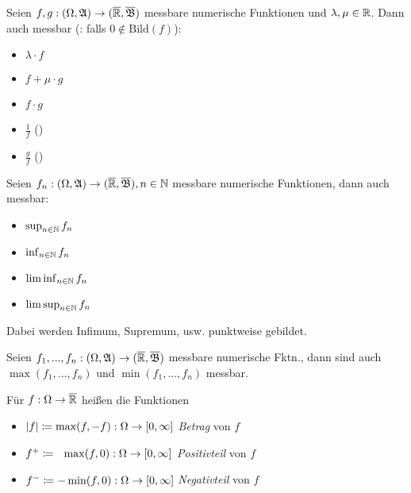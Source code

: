 \documentclass{cheat-sheet}
\newcommand{\Alg}{\mathfrak{A}} %
\newcommand{\Bor}{\mathfrak{B}} %
\theoremstyle{definition}
\begin{document}
\begin{satz}
  Seien $f, g : (\Omega, \Alg) \to (\ER, \overline{\Bor})$ messbare numerische Funktionen und $\lambda, \mu \in \mathbb{R}$. Dann auch messbar (\ddag: falls $0 \not\in \mathrm{Bild}(f)$):
  \begin{multicols}{5}
    \begin{itemize}
      \item $\lambda \cdot f$
      \item $f + \mu \cdot g$
      \item $f \cdot g$
      \item $\tfrac{1}{f}$ (\ddag)
      \item $\tfrac{g}{f}$ (\ddag)
    \end{itemize}
  \end{multicols}
\end{satz}

\begin{satz}
  Seien $f_n : (\Omega, \Alg) \to (\ER, \overline{\Bor}), n \in \N$ messbare numerische Funktionen, dann auch messbar:
  \begin{multicols}{4}
    \begin{itemize}
      \item $\sup_{n \in \mathbb{N}} f_n$
      \item $\inf_{n \in \mathbb{N}} f_n$
      \item $\liminf_{n \in \mathbb{N}} f_n$
      \item $\limsup_{n \in \mathbb{N}} f_n$
    \end{itemize}
  \end{multicols}
  \vspace{4pt}
  Dabei werden Infimum, Supremum, usw. punktweise gebildet.
\end{satz}

\begin{satz}
  Seien $f_1, ..., f_n : (\Omega, \Alg) \to (\ER, \overline{\Bor})$ messbare numerische Fktn., dann sind auch $\max(f_1, ..., f_n)$ und $\min(f_1, ..., f_n)$ messbar.
\end{satz}

\begin{defn}
  Für $f : \Omega \to \overline{\mathbb{R}}$ heißen die Funktionen
  \begin{itemize}
    \item $\lvert f\rvert \coloneqq \max(f, -f) : \Omega \to \left[ 0, \infty \right]$ \emph{Betrag} von $f$
    \item $f^+ \coloneqq \,\,\,\, \max(f, 0) : \Omega \to \left[ 0, \infty \right]$ \emph{Positivteil} von $f$
    \item $f^- \coloneqq -\min(f, 0) : \Omega \to \left[ 0, \infty \right]$ \emph{Negativteil} von $f$
  \end{itemize}
\end{defn}
\end{document}
